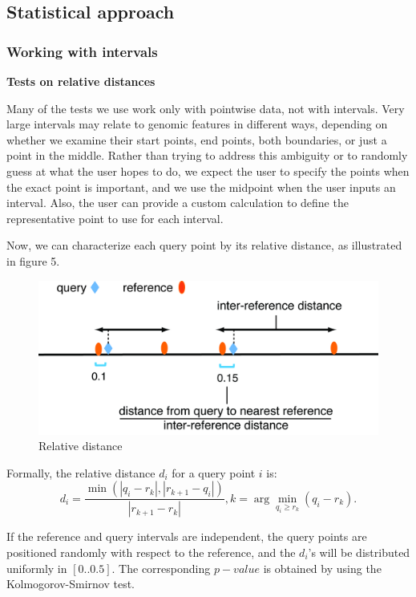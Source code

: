 \documentclass{article}
\begin{document}
\subsection{Statistical approach}

\subsubsection{Working with intervals}
{\bf Tests on relative distances}

Many of the tests we use work only with pointwise data, not with intervals. Very large intervals may relate to genomic features in different ways, depending on whether we examine their start points, end points, both boundaries, or just a point in the middle. Rather than trying to address this ambiguity or to randomly guess at what the user hopes to do, we expect the user to specify the points when the exact point is important, and we use the midpoint when the user inputs an interval. Also, the user can provide a custom calculation to define the representative point to use for each interval.

Now, we can characterize each query point by its relative distance, as illustrated in figure 5. 

\begin{figure}[h]
	\centering\includegraphics[scale=\picscale]{png/fig5}
	\caption{Relative distance}
\end{figure}

Formally, the relative distance $d_i$ for a query point $i$ is: 
\[d_i=\displaystyle\frac{\min\left(\left|q_i-r_k\right|,\left|r_{k+1}-q_i\right|\right)}{\left|r_{k+1}-r_k\right|}, k=\arg\min_{q_i \geq r_k}(q_i-r_k).\]

If the reference and query intervals are independent, the query points are positioned randomly with respect to the reference, and the $d_i$'s will be distributed uniformly in $\left[0..0.5\right]$. The corresponding $p-value$ is obtained by using the Kolmogorov-Smirnov test.
\end{document}
